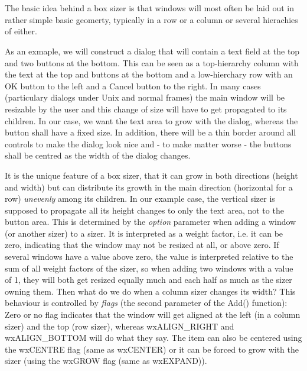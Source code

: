 \section{}\label{wxboxsizer}

The basic idea behind a box sizer is that windows will most often be laid out in rather 
simple basic geomerty, typically in a row or a column or several hierachies of either.

As an exmaple, we will construct a dialog that will contain a text field at the top and
two buttons at the bottom. This can be seen as a top-hierarchy column with the text at
the top and buttons at the bottom and a low-hierchary row with an OK button to the left
and a Cancel button to the right. In many cases (particulary dialogs under Unix and
normal frames) the main window will be resizable by the user and this change of size
will have to get propagated to its children. In our case, we want the text area to grow
with the dialog, whereas the button shall have a fixed size. In addition, there will be
a thin border around all controls to make the dialog look nice and - to make matter worse -
the buttons shall be centred as the width of the dialog changes.

It is the unique feature of a box sizer, that it can grow in both directions (height and
width) but can distribute its growth in the main direction (horizontal for a row) {\it unevenly}
among its children. In our example case, the vertical sizer is supposed to propagate all its
height changes to only the text area, not to the button area. This is determined by the
{\it option} parameter when adding a window (or another sizer) to a sizer. It is interpreted
as a weight factor, i.e. it can be zero, indicating that the window may not be resized
at all, or above zero. If several windows have a value above zero, the value is interpreted
relative to the sum of all weight factors of the sizer, so when adding two windows with
a value of 1, they will both get resized equally much and each half as much as the sizer 
owning them. Then what do we do when a column sizer changes its width? This behaviour is
controlled by {\it flags} (the second parameter of the Add() function): Zero or no flag indicates that
the window will get aligned at the left (in a column sizer) and the top (row sizer), whereas
wxALIGN\_RIGHT and wxALIGN\_BOTTOM will do what they say. The item can also be centered
using the wxCENTRE flag (same as wxCENTER) or it can be forced to grow with the sizer (using
the wxGROW flag (same as wxEXPAND)).

